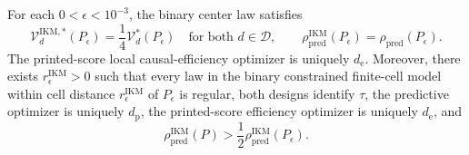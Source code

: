 For each \(0<\epsilon<10^{-3}\), the binary center law satisfies
\[
 \mathcal V_d^{\mathrm{IKM},*}(P_\epsilon)
 =\frac14\mathcal V_d^*(P_\epsilon)
 \quad\text{for both }d\in\mathcal D,
 \qquad
 \rho_{\mathrm{pred}}^{\mathrm{IKM}}(P_\epsilon)
 =\rho_{\mathrm{pred}}(P_\epsilon).
\]
The printed-score local causal-efficiency optimizer is uniquely \(d_{\mathrm e}\).  Moreover, there exists \(r_\epsilon^{\mathrm{IKM}}>0\) such that every law in the binary constrained finite-cell model within cell distance \(r_\epsilon^{\mathrm{IKM}}\) of \(P_\epsilon\) is regular, both designs identify \(\tau\), the predictive optimizer is uniquely \(d_{\mathrm p}\), the printed-score efficiency optimizer is uniquely \(d_{\mathrm e}\), and
\[
 \rho_{\mathrm{pred}}^{\mathrm{IKM}}(P)
 >\frac12\rho_{\mathrm{pred}}^{\mathrm{IKM}}(P_\epsilon).
\]